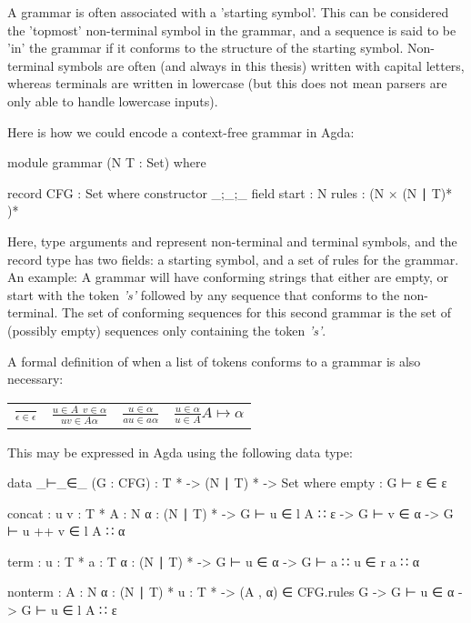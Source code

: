 	A grammar is often associated with a 'starting symbol'. This can be 
	considered the 'topmost' non-terminal symbol in the grammar, and a sequence 
	is said to be 'in' the grammar if it conforms to the structure of the 
	starting symbol. Non-terminal symbols are often (and always in this thesis) 
	written with capital letters, whereas terminals are written in lowercase 
	(but this does not mean parsers are only able to handle lowercase inputs).

	Here is how we could encode a context-free grammar in Agda:

	\begin{code}
		module grammar (N T : Set) where

		record CFG : Set where
		  constructor _;_;_
		  field
		    start : N
		    rules : (N × (N ∣ T)* )*
	\end{code}

	Here, type arguments  and  represent non-terminal and
	terminal symbols, and the record type has two fields: a starting symbol,
	and a set of rules for the grammar.  An example: A grammar  will have conforming strings that
	either are empty, or start with the token \emph{'s'} followed by any
	sequence that conforms to the  non-terminal. The set of
	conforming sequences for this second grammar is the set of (possibly empty)
	sequences only containing the token \emph{'s'}.

	A formal definition of when a list of tokens conforms to a grammar is also
	necessary:

	\begin{table}[h]
	\centering
	\begin{tabular}{cccc}
			 \( \displaystyle \frac{\ }{\epsilon\in\epsilon} \) &
			 \( \displaystyle \frac{u\in A\ \ v\in\alpha}{uv\in A\alpha} \) &
			 \( \displaystyle \frac{u\in\alpha}{au\in a\alpha} \) &
			 \( \displaystyle \frac{u\in\alpha}{u\in A}A \mapsto \alpha \)
	\end{tabular}
	\end{table}

	This may be expressed in Agda using the following data type:

	\begin{code}
		data _⊢_∈_ (G : CFG) :  T * -> (N ∣ T) * -> Set where
		  empty :
		    G ⊢ ε ∈ ε

		  concat : {u v : T *} {A : N} {α : (N ∣ T) *} ->
		    G ⊢ u ∈ l A ∷ ε -> G ⊢ v ∈ α -> G ⊢ u ++ v ∈ l A ∷ α

		  term : {u : T *} {a : T} {α : (N ∣ T) *} ->
		    G ⊢ u ∈ α -> G ⊢ a ∷ u ∈ r a ∷ α

		  nonterm : {A : N} {α : (N ∣ T) *} {u : T *} ->
		    (A , α) ∈ CFG.rules G -> G ⊢ u ∈ α -> G ⊢ u ∈ l A ∷ ε
	\end{code}

